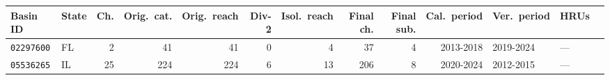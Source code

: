 \begin{tabular}{@{}llrrrrrrrrllr@{}}
\toprule
Basin ID & State & Ch. & Orig.\ cat. & Orig.\ reach & Div-2 & Isol.\ reach & Final ch. & Final sub. & Cal.\ period & Ver.\ period & HRUs \\
\midrule
\texttt{02297600} & FL & 2 & 41 & 41 & 0 & 4 & 37 & 4 & 2013-2018 & 2019-2024 & --- \\
\texttt{05536265} & IL & 25 & 224 & 224 & 6 & 13 & 206 & 8 & 2020-2024 & 2012-2015 & --- \\
\bottomrule
\end{tabular}

